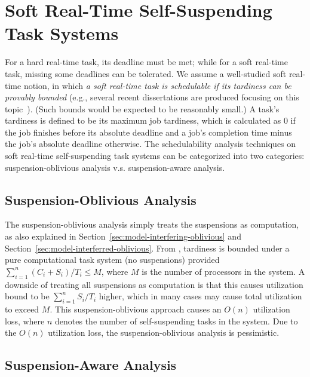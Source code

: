 \section{Soft Real-Time Self-Suspending Task Systems}
\label{sec:soft-realtime}

For a hard real-time task, its deadline must be met; while for a soft real-time task, missing some deadlines can be tolerated. We assume a well-studied soft real-time notion, in which \emph{a soft real-time task is schedulable if its tardiness can be provably bounded} (e.g., several recent dissertations are produced focusing on this topic~\cite{leontyev2010compositional, devi2006soft}). (Such bounds would be expected to be reasonably small.) A task's tardiness is defined to be its maximum job tardiness, which is calculated as $0$ if the job finishes before its absolute deadline and a job's completion time minus the job's absolute deadline otherwise.
The schedulability analysis techniques on soft real-time self-suspending task systems can be categorized into two categories: suspension-oblivious analysis v.s. suspension-aware analysis.

\subsection{Suspension-Oblivious Analysis}
\label{sec:sus-oblivious-soft}

 The suspension-oblivious analysis simply treats the suspensions as computation, as also explained in Section~\ref{sec:model-interfering-oblivious} and Section~\ref{sec:model-interferred-oblivious}. From \cite{Devi2005,Leontyev072}, tardiness is bounded under a pure computational task system (no suspensions) provided $\sum_{i=1}^{n} (C_i+S_i)/T_i \leq M$, where $M$ is the number of processors in the system. A downside of treating all suspensions as computation is that this causes utilization bound to be $\sum_{i=1}^{n} S_i/T_i$ higher, which in many cases may cause total utilization to exceed $M$.  This suspension-oblivious approach causes an $O(n)$ utilization loss, where $n$ denotes the number of self-suspending tasks in the system. 
 Due to the $O(n)$ utilization loss, the suspension-oblivious analysis is pessimistic. 

\subsection{Suspension-Aware Analysis}
\label{sec:sus-aware-soft}

